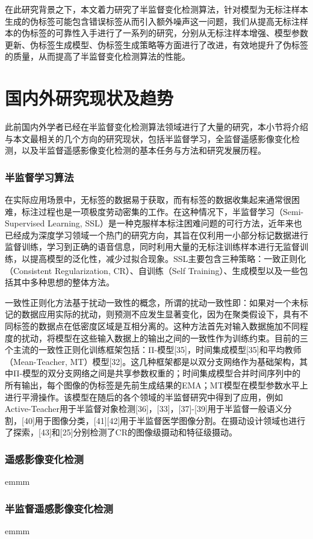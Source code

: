 \documentclass[lang=chs, degree=master, blindreview=false, adobe=false]{yanputhesis}
\begin{document}
在此研究背景之下，本文着力研究了半监督变化检测算法，针对模型为无标注样本生成的伪标签可能包含错误标签从而引入额外噪声这一问题，我们从提高无标注样本的伪标签的可靠性入手进行了一系列的研究，分别从无标注样本增强、模型参数更新、伪标签生成模型、伪标签生成策略等方面进行了改进，有效地提升了伪标签的质量，从而提高了半监督变化检测算法的性能。

\section{国内外研究现状及趋势}
此前国内外学者已经在半监督变化检测算法领域进行了大量的研究，本小节将介绍与本文最相关的几个方向的研究现状，包括半监督学习，全监督遥感影像变化检测，以及半监督遥感影像变化检测的基本任务与方法和研究发展历程。
\subsubsection{半监督学习算法}
在实际应用场景中，无标签的数据易于获取，而有标签的数据收集起来通常很困难，标注过程也是一项极度劳动密集的工作。在这种情况下，半监督学习（Semi-Supervised Learning, SSL）是一种克服样本标注困难问题的可行方法，近年来也已经成为深度学习领域一个热门的研究方向，其旨在仅利用一小部分标记数据进行监督训练，学习到正确的语音信息，同时利用大量的无标注训练样本进行无监督训练，以提高模型的泛化性，减少过拟合现象。SSL主要包含三种策略：一致正则化（Consistent Regularization, CR）、自训练（Self Training）、生成模型以及一些包括其中多种思想的整体方法。

一致性正则化方法基于扰动一致性的概念，所谓的扰动一致性即：如果对一个未标记的数据应用实际的扰动，则预测不应发生显著变化，因为在聚类假设下，具有不同标签的数据点在低密度区域是互相分离的。这种方法首先对输入数据施加不同程度的扰动，将模型在这些输入数据上的输出之间的一致性作为训练约束。目前的三个主流的一致性正则化训练框架包括：Π-模型[35]，时间集成模型[35]和平均教师（Mean-Teacher, MT）模型[32]。这几种框架都是以双分支网络作为基础架构，其中Π-模型的双分支网络之间是共享参数权重的；时间集成模型合并时间序列中的所有输出，每个图像的伪标签是先前生成结果的EMA；MT模型在模型参数水平上进行平滑操作。该模型在随后的各个领域的半监督研究中得到了应用，例如Active-Teacher用于半监督对象检测[36]，[33]，[37]-[39]用于半监督一般语义分割，[40]用于图像分类，[41][42]用于半监督医学图像分割。在摄动设计领域也进行了探索，[43]和[25]分别检测了CR的图像级摄动和特征级摄动。
\subsubsection{遥感影像变化检测}
emmm
\subsubsection{半监督遥感影像变化检测}
emmm
\end{document}
